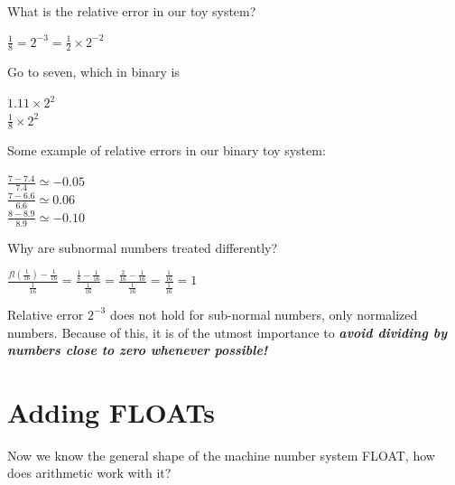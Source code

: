 \documentclass[a4paper,12pt]{report}
\begin{document}
	What is the relative error in our toy system?

\begin{center}
	$\frac{1}{8}=2^{-3}=\frac{1}{2} \times 2^{-2}$
\end{center}

	Go to seven, which in binary is

\begin{center}
	$1.11 \times 2^2$\\
	$\frac{1}{8} \times 2^2$\\
\end{center}


	Some example of relative errors in our binary toy system:

\begin{center}
	$\frac{7-7.4}{7.4}\simeq -0.05$\\
	\bigskip
	$\frac{7-6.6}{6.6} \simeq 0.06$\\
	\bigskip
	$\frac{8-8.9}{8.9} \simeq -0.10$\\
\end{center}

	Why are subnormal numbers treated differently?

\begin{center}
	\begin{Large}
	$\frac{fl(\frac{1}{16})-\frac{1}{16}}{\frac{1}{16}}
		=\frac{\frac{1}{8}-\frac{1}{16}}{\frac{1}{16}}
		=\frac{\frac{2}{16}-\frac{1}{16}}{\frac{1}{16}}=\frac{\frac{1}{16}}{\frac{1}{16}}=1$
	\end{Large}
\end{center}

	Relative error $2^{-3}$ does not hold for sub-normal numbers, only normalized numbers.  
	Because of this, it is of the utmost importance to \textit{\textbf{avoid dividing by numbers close to 
	zero whenever possible!}}

\section{Adding FLOATs}

	Now we know the general shape of the machine number system FLOAT, how does arithmetic work 
	with it?
\end{document}
